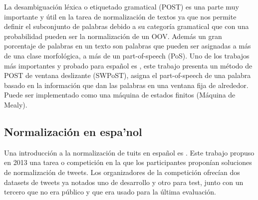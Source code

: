 \documentclass[spanish,12pt, a4paper,twoside]{paper}
\begin{document}
La desambiguación léxica o etiquetado gramatical (POST) es una parte muy importante y útil en la tarea de normalización de textos ya que nos permite definir el subconjunto de palabras debido a su categoría gramatical que con una probabilidad pueden ser la normalización de un OOV. Además un gran porcentaje de palabras en un texto son palabras que pueden ser asignadas a más de una clase morfológica, a más de un part-of-speech (PoS). Uno de los trabajos más importantes y probado para español es \cite{sanchezforcada:2004}, este trabajo presenta un método de POST de ventana deslizante (SWPoST), asigna el part-of-speech de una palabra basado en la información que dan las palabras en una ventana fija de alrededor. Puede ser implementado como una máquina de estados finitos (Máquina de Mealy).


\subsection{Normalización en espa'nol}\label{sec:normalzacionenespanol}
Una introducción a la normalización de tuits en español es \cite{alegria:2013}\cite{alegria:2015}. Este trabajo propuso en 2013 una tarea o competición en la que los participantes proponían soluciones de normalización de tweets. Los organizadores de la competición ofrecían dos datasets de tweets ya notados uno de desarrollo y otro para test, junto con un tercero que no era público y que era usado para la última evaluación.\\\\
\end{document}
